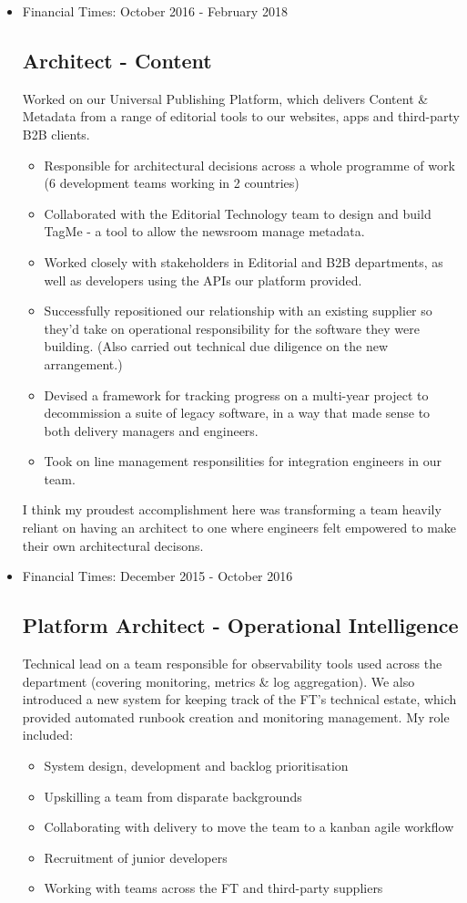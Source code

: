 \documentclass[a4paper]{article}
\begin{document}
\begin{itemize}
\item Financial Times: October 2016 - February 2018
\subsection*{Architect - Content}
Worked on our Universal Publishing Platform, which delivers Content \& Metadata from a range of editorial tools to our websites, apps and third-party B2B clients.

\begin{itemize}
	\item Responsible for architectural decisions across a whole programme of work (6 development teams working in 2 countries)
	\item Collaborated with the Editorial Technology team to design and build TagMe - a tool to allow the newsroom manage metadata.
	\item Worked closely with stakeholders in Editorial and B2B departments, as well as developers using the APIs our platform provided.
	\item Successfully repositioned our relationship with an existing supplier so they'd take on operational responsibility for the software they were building.  (Also carried out technical due diligence on the new arrangement.)
	\item Devised a framework for tracking progress on a multi-year project to decommission a suite of legacy software, in a way that made sense to both delivery managers and engineers.
	\item Took on line management responsilities for integration engineers in our team.
\end{itemize}
I think my proudest accomplishment here was transforming a team heavily reliant on having an architect to one where engineers felt empowered to make their own architectural decisons.


\item Financial Times: December 2015 - October 2016
\subsection*{Platform Architect - Operational Intelligence}
Technical lead on a team responsible for observability tools used across the department (covering monitoring, metrics \& log aggregation).  We also introduced a new system for keeping track of the FT's technical estate, which provided automated runbook creation and monitoring management.  My role included:
\begin{itemize}
	\item System design, development and backlog prioritisation
	\item Upskilling a team from disparate backgrounds
	\item Collaborating with delivery to move the team to a kanban agile workflow
	\item Recruitment of junior developers
	\item Working with teams across the FT and third-party suppliers
\end{itemize}


\end{itemize}
\end{document}

